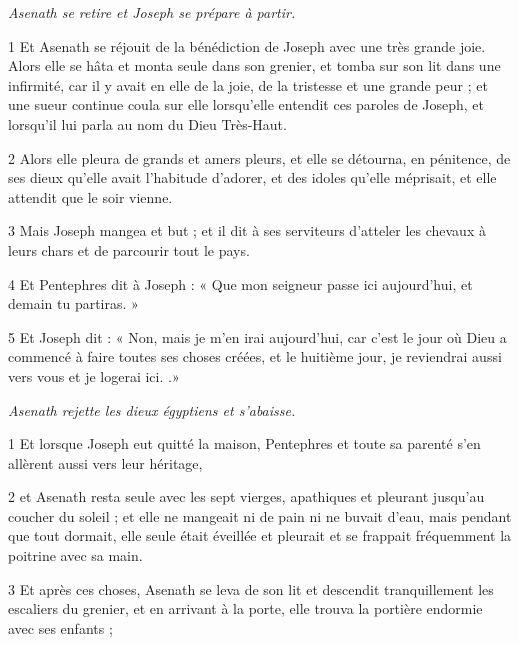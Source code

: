 
\par \textit{Asenath se retire et Joseph se prépare à partir.}

\par 1 Et Asenath se réjouit de la bénédiction de Joseph avec une très grande joie. Alors elle se hâta et monta seule dans son grenier, et tomba sur son lit dans une infirmité, car il y avait en elle de la joie, de la tristesse et une grande peur ; et une sueur continue coula sur elle lorsqu'elle entendit ces paroles de Joseph, et lorsqu'il lui parla au nom du Dieu Très-Haut.

\par 2 Alors elle pleura de grands et amers pleurs, et elle se détourna, en pénitence, de ses dieux qu'elle avait l'habitude d'adorer, et des idoles qu'elle méprisait, et elle attendit que le soir vienne.

\par 3 Mais Joseph mangea et but ; et il dit à ses serviteurs d'atteler les chevaux à leurs chars et de parcourir tout le pays.

\par 4 Et Pentephres dit à Joseph : « Que mon seigneur passe ici aujourd'hui, et demain tu partiras. »

\par 5 Et Joseph dit : « Non, mais je m'en irai aujourd'hui, car c'est le jour où Dieu a commencé à faire toutes ses choses créées, et le huitième jour, je reviendrai aussi vers vous et je logerai ici. .»


\par \textit{Asenath rejette les dieux égyptiens et s'abaisse.}

\par 1 Et lorsque Joseph eut quitté la maison, Pentephres et toute sa parenté s'en allèrent aussi vers leur héritage,

\par 2 et Asenath resta seule avec les sept vierges, apathiques et pleurant jusqu'au coucher du soleil ; et elle ne mangeait ni de pain ni ne buvait d'eau, mais pendant que tout dormait, elle seule était éveillée et pleurait et se frappait fréquemment la poitrine avec sa main.

\par 3 Et après ces choses, Asenath se leva de son lit et descendit tranquillement les escaliers du grenier, et en arrivant à la porte, elle trouva la portière endormie avec ses enfants ;

